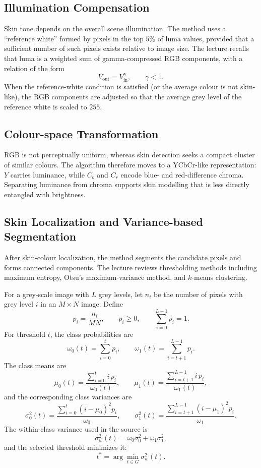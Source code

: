 \documentclass[11pt,a4paper,oneside]{report}
\begin{document}
\subsection{Illumination Compensation}

Skin tone depends on the overall scene illumination.  The method uses a
``reference white'' formed by pixels in the top $5\%$ of luma values, provided
that a sufficient number of such pixels exists relative to image size.  The
lecture recalls that luma is a weighted sum of gamma-compressed RGB components,
with a relation of the form
\[
    V_{\mathrm{out}}=V_{\mathrm{in}}^{\gamma},\qquad \gamma<1.
\]
When the reference-white condition is satisfied (or the average colour is not
skin-like), the RGB components are adjusted so that the average grey level of
the reference white is scaled to $255$.

\subsection{Colour-space Transformation}

RGB is not perceptually uniform, whereas skin detection seeks a compact cluster
of similar colours.  The algorithm therefore moves to a YCbCr-like
representation: $Y$ carries luminance, while $C_b$ and $C_r$ encode blue- and
red-difference chroma.  Separating luminance from chroma supports skin modelling
that is less directly entangled with brightness.

\subsection{Skin Localization and Variance-based Segmentation}

After skin-colour localization, the method segments the candidate pixels and
forms connected components.  The lecture reviews thresholding methods including
maximum entropy, Otsu's maximum-variance method, and $k$-means clustering.

For a grey-scale image with $L$ grey levels, let $n_i$ be the number of pixels
with grey level $i$ in an $M\times N$ image.  Define
\[
    p_i=\frac{n_i}{MN},\qquad p_i\ge 0,
    \qquad \sum_{i=0}^{L-1}p_i=1.
\]
For threshold $t$, the class probabilities are
\[
    \omega_0(t)=\sum_{i=0}^{t}p_i,
    \qquad
    \omega_1(t)=\sum_{i=t+1}^{L-1}p_i.
\]
The class means are
\[
    \mu_0(t)=\frac{\sum_{i=0}^{t}i\,p_i}{\omega_0(t)},
    \qquad
    \mu_1(t)=\frac{\sum_{i=t+1}^{L-1}i\,p_i}{\omega_1(t)},
\]
and the corresponding class variances are
\[
    \sigma_0^2(t)=\frac{\sum_{i=0}^{t}(i-\mu_0)^2p_i}{\omega_0},
    \qquad
    \sigma_1^2(t)=\frac{\sum_{i=t+1}^{L-1}(i-\mu_1)^2p_i}{\omega_1}.
\]
The within-class variance used in the source is
\[
    \sigma_w^2(t)=\omega_0\sigma_0^2+\omega_1\sigma_1^2,
\]
and the selected threshold minimizes it:
\[
    t^{\ast}=\arg\min_{t\in G}\sigma_w^2(t).
\]
\end{document}
